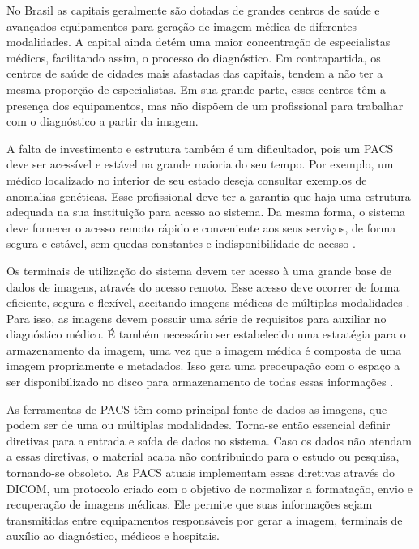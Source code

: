 No Brasil as capitais geralmente são dotadas de grandes centros de saúde e avançados equipamentos para geração de imagem médica de diferentes modalidades.
A capital ainda detém uma maior concentração de especialistas médicos, facilitando assim, o processo do diagnóstico.
Em contrapartida, os centros de saúde de cidades mais afastadas das capitais, tendem a não ter a mesma proporção de especialistas.
Em sua grande parte, esses centros têm a presença dos equipamentos, mas não dispõem de um profissional para trabalhar com o diagnóstico a partir da imagem.

A falta de investimento e estrutura também é um dificultador, pois um PACS deve ser acessível e estável na grande maioria do seu tempo.
Por exemplo, um médico localizado no interior de seu estado deseja consultar exemplos de anomalias genéticas.
Esse profissional deve ter a garantia que haja uma estrutura adequada na sua instituição para acesso ao sistema.
Da mesma forma, o sistema deve fornecer o acesso remoto rápido e conveniente aos seus serviços, de forma segura e estável, sem quedas constantes e indisponibilidade de acesso \cite{REF19}.

Os terminais de utilização do sistema devem ter acesso à uma grande base de dados de imagens, através do acesso remoto.
Esse acesso deve ocorrer de forma eficiente, segura e flexível, aceitando imagens médicas de múltiplas modalidades \cite{REF18}.
Para isso, as imagens devem possuir uma série de requisitos para auxiliar no diagnóstico médico.
É também necessário ser estabelecido uma estratégia para o armazenamento da imagem, uma vez que a imagem médica é composta de uma imagem propriamente e metadados.
Isso gera uma preocupação com o espaço a ser disponibilizado no disco para armazenamento de todas essas informações \cite{REF10}.

As ferramentas de PACS têm como principal fonte de dados as imagens, que podem ser de uma ou múltiplas modalidades.
Torna-se então essencial definir diretivas para a entrada e saída de dados no sistema.
Caso os dados não atendam a essas diretivas, o material acaba não contribuindo para o estudo ou pesquisa, tornando-se obsoleto.
As PACS atuais implementam essas diretivas através do DICOM, um protocolo criado com o objetivo de normalizar a formatação, envio e recuperação de imagens médicas.
Ele permite que suas informações sejam transmitidas entre equipamentos responsáveis por gerar a imagem, terminais de auxílio ao diagnóstico, médicos e hospitais.

